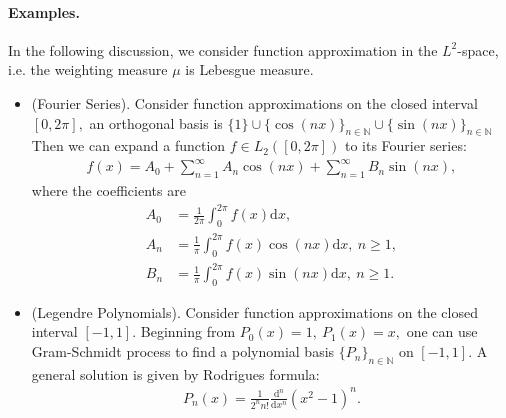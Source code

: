 \documentclass{article}
\begin{document}
\paragraph{Examples.} In the following discussion, we consider function approximation in the $L^2$-space, i.e. the weighting measure $\mu$ is Lebesgue measure.
\begin{itemize}
	\vspace{0.1cm}
	\item (Fourier Series). Consider function approximations on the closed interval $[0,2\pi],$ an orthogonal basis is $\lbrace 1 \rbrace\cup\lbrace \cos(nx)\rbrace_{n\in\mathbb{N}}\cup\lbrace \sin(nx) \rbrace_{n\in\mathbb{N}}$ Then we can expand a function $f\in L_2([0,2\pi])$ to its Fourier series:
	\begin{align*}
		f(x) = A_0 + \sum_{n=1}^\infty A_n\cos(nx) + \sum_{n=1}^\infty B_n\sin(nx),\tag{7.22}
	\end{align*}
	where the coefficients are
	\begin{align*}
		A_0 &= \frac{1}{2\pi}\int_0^{2\pi}f(x)\mathrm{d}x,\tag{7.24}\\
		A_n &= \frac{1}{\pi}\int_0^{2\pi}f(x)\cos(nx)\mathrm{d}x,\ n\geq 1,\tag{7.25}\\
		B_n &= \frac{1}{\pi}\int_0^{2\pi}f(x)\sin(nx)\mathrm{d}x,\ n\geq 1.\tag{7.26}
	\end{align*}
\item (Legendre Polynomials). Consider function approximations on the closed interval $[-1,1].$ Beginning from $P_0(x)=1,\ P_1(x)=x,$ one can use Gram-Schmidt process to find a polynomial basis $\lbrace P_n\rbrace_{n\in\mathbb{N}}$ on $[-1,1].$ A general solution is given by Rodrigues formula:
\begin{align*}
	P_n(x) = \frac{1}{2^n n!}\frac{\mathrm{d}^n}{\mathrm{d}x^n}(x^2 - 1)^n.\tag{7.27}
\end{align*}
\end{itemize}
\end{document}
